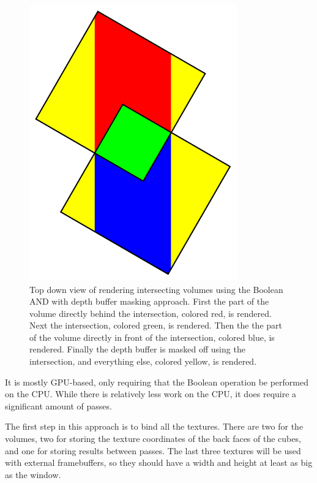 \documentclass{article}
\begin{document}
\begin{figure}
\centering
\includegraphics[width=0.8\textwidth]{boolean-and.pdf}
\caption{
Top down view of rendering intersecting volumes using the Boolean AND with depth
buffer masking approach.  First the part of the volume directly behind the
intersection, colored red, is rendered.  Next the intersection, colored green,
is rendered.  Then the the part of the volume directly in front of the
intersection, colored blue, is rendered.  Finally the depth buffer is masked off
using the intersection, and everything else, colored yellow, is rendered.
}
\label{boolean-and}
\end{figure}

It is mostly GPU-based, only requiring that the Boolean operation be performed
on the CPU.  While there is relatively less work on the CPU, it does require a
significant amount of passes.

The first step in this approach is to bind all the textures.  There are two for
the volumes, two for storing the texture coordinates of the back faces of the
cubes, and one for storing results between passes.  The last three textures will
be used with external framebuffers, so they should have a width and height at
least as big as the window.
\end{document}
